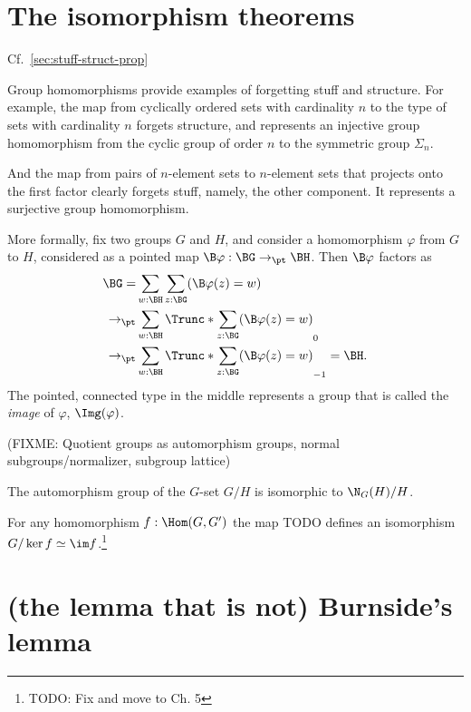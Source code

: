 
\section{The isomorphism theorems}
\label{sec:noether-theorems}

Cf.~\cref{sec:stuff-struct-prop}

Group homomorphisms provide examples of forgetting stuff and structure.
For example, the map from cyclically ordered sets with cardinality $n$
to the type of sets with cardinality $n$ forgets structure,
and represents an injective group homomorphism from the cyclic
group of order $n$ to the symmetric group $\Sigma_n$.

And the map from pairs of $n$-element sets to $n$-element sets
that projects onto the first factor clearly forgets stuff,
namely, the other component.
It represents a surjective group homomorphism.

More formally, fix two groups $G$ and $H$,
and consider a homomorphism $\varphi$ from $G$ to $H$,
considered as a pointed map $\B\varphi : \BG \to_\pt \BH$.
Then $\B\varphi$ factors as
\begin{align*}
  \BG
  = &\sum_{w:\BH}\sum_{z:\BG}(\B\varphi(z)=w)\\
  \to_\pt &\sum_{w:\BH}\Trunc*{\sum_{z:\BG}(\B\varphi(z)=w)}_0\\
  \to_\pt &\sum_{w:\BH}\Trunc*{\sum_{z:\BG}(\B\varphi(z)=w)}_{-1} = \BH.
\end{align*}
The pointed, connected type in the middle represents a group
that is called the \emph{image} of $\varphi$, $\Img(\varphi)$.


(FIXME: Quotient groups as automorphism groups, normal subgroups/normalizer, subgroup lattice)

\begin{lemma}
  \label{lem:aut-orbit}
  The automorphism group of the $G$-set $G/H$ is isomorphic to $\N_G(H)/H$.
\end{lemma}

\begin{theorem}
  \label{thm:fund-thm-homs}
  For any homomorphism $f : \Hom(G,G')$
  the map {\color{blue} TODO} defines an isomorphism
  $G/\ker f \simeq \im f$.\footnote{TODO: Fix and move to Ch. 5}
\end{theorem}

\section{(the lemma that is not) Burnside's lemma}
\label{sec:burnsides-lemma}
\label{lem:burnsides-lemma}

